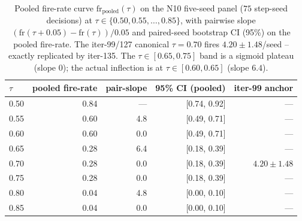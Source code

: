 \begin{table}[t]
\centering
\small
\begin{tabular}{lrrrr}
\hline
$\tau$ & pooled fire-rate & pair-slope & 95\% CI (pooled) & iter-99 anchor \\
\hline
0.50 & 0.84 & --- & [0.74, 0.92] & --- \\
0.55 & 0.60 & 4.8 & [0.49, 0.71] & --- \\
0.60 & 0.60 & 0.0 & [0.49, 0.71] & --- \\
0.65 & 0.28 & 6.4 & [0.18, 0.39] & --- \\
0.70 & 0.28 & 0.0 & [0.18, 0.39] & $4.20 \pm 1.48$ \\
0.75 & 0.28 & 0.0 & [0.18, 0.39] & --- \\
0.80 & 0.04 & 4.8 & [0.00, 0.10] & --- \\
0.85 & 0.04 & 0.0 & [0.00, 0.10] & --- \\
\hline
\end{tabular}
\caption{Pooled fire-rate curve $\mathrm{fr}_\mathrm{pooled}(\tau)$ on
the N10 five-seed panel ($75$ step-seed decisions) at $\tau \in
\{0.50, 0.55, \ldots, 0.85\}$, with pairwise slope
$(\mathrm{fr}(\tau{+}0.05) - \mathrm{fr}(\tau)) / 0.05$ and
paired-seed bootstrap CI (95\%) on the pooled fire-rate. The
iter-99/127 canonical $\tau=0.70$ fires $4.20 \pm 1.48$/seed -- exactly
replicated by iter-135. The $\tau \in [0.65, 0.75]$ band is a sigmoid
plateau (slope $0$); the actual inflection is at $\tau \in [0.60, 0.65]$
(slope $6.4$).}
\label{tab:p7-iter135-fire-rate}
\end{table}
